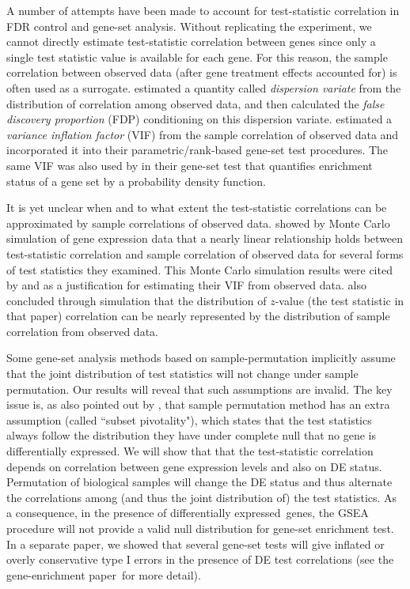 \documentclass[12pt, a4paper]{article}
\newcommand{\DED}{differentially expressed}
\newcommand{\genesetpaper}{the gene-enrichment paper}
\begin{document}
A number of attempts have been made to account for test-statistic
correlation in FDR control and gene-set analysis. 
Without replicating the experiment, we cannot directly estimate test-statistic
correlation between genes since only a single test statistic value is 
available for each gene. For this reason, the sample correlation
between observed data (after gene 
treatment effects accounted for) is often used as a surrogate.
\citet{efron2007correlation} estimated a quantity called \textit{dispersion variate} from the 
distribution 
of correlation among observed data, and then calculated the \textit{false discovery proportion} 
(FDP) conditioning on this dispersion variate. \citet{wu2012camera} estimated a \textit{variance 
	inflation factor} (VIF) from the sample correlation of observed data and 
incorporated it into their parametric/rank-based gene-set test procedures. The same VIF was also 
used by \citet{yaari2013quantitative} in their gene-set test that quantifies enrichment status of a 
gene set by a probability density function. 

It is yet unclear when and to what extent the test-statistic correlations can be approximated 
by sample correlations of observed data. \citet{barry2008statistical} showed by Monte Carlo 
simulation of gene expression data that a nearly linear relationship holds between test-statistic 
correlation and sample correlation of observed data for
several forms of test statistics they examined. This Monte Carlo
simulation results were cited by \citet{wu2012camera} and
\citet{yaari2013quantitative} as a justification for estimating their
VIF from observed data. \citet{efron2007correlation} also concluded
through simulation that the distribution of $z$-value (the test
statistic in that paper) correlation can be nearly represented by the
distribution of sample correlation from observed data. 	


Some gene-set analysis methods based on sample-permutation implicitly
assume that the joint distribution of test statistics will not change
under sample permutation. Our results will reveal that such assumptions
are invalid. The key issue is, as also pointed out by  \citet{efron2012large1}, that sample 
permutation method has an extra assumption (called ``subset pivotality"), which states that the 
test statistics always follow the distribution they have under complete null that no gene is \DED.
We will show that that the test-statistic correlation depends on
correlation between gene expression levels and also on DE status.
Permutation of biological samples will change the DE status and thus
alternate the correlations among  (and thus the joint distribution of) the
test statistics. As a consequence, in the presence of \DED~genes, the
GSEA \citep{subramanian2005gene} procedure will not provide a valid null distribution for 
gene-set enrichment test. In a separate paper, we showed that several
gene-set tests will give inflated or overly conservative type I errors in the presence of DE test
correlations (see \genesetpaper~for more detail).
\end{document}
